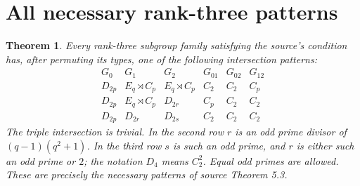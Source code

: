 \documentclass[11pt,a4paper]{article}
\newtheorem{theorem}[lemma]{Theorem}
\begin{document}
\section{All necessary rank-three patterns}
\begin{theorem}\label{patterns}
Every rank-three subgroup family satisfying the source's condition has,
after permuting its types, one of the following intersection patterns:
\[
\begin{array}{c|c|c|c|c|c}
 G_0&G_1&G_2&G_{01}&G_{02}&G_{12}\\\hline
 D_{2p}&E_q\rtimes C_p&E_q\rtimes C_p&C_2&C_2&C_p\\
 D_{2p}&E_q\rtimes C_p&D_{2r}&C_p&C_2&C_2\\
 D_{2p}&D_{2r}&D_{2s}&C_2&C_2&C_2
\end{array}
\]
The triple intersection is trivial. In the second row $r$ is an odd
prime divisor of $(q-1)(q^2+1)$. In the third row $s$ is such an odd
prime, and $r$ is either such an odd prime or $2$; the notation
$D_4$ means $C_2^2$. Equal odd primes are allowed.
These are precisely the necessary patterns of source Theorem 5.3.
\end{theorem}
\end{document}
